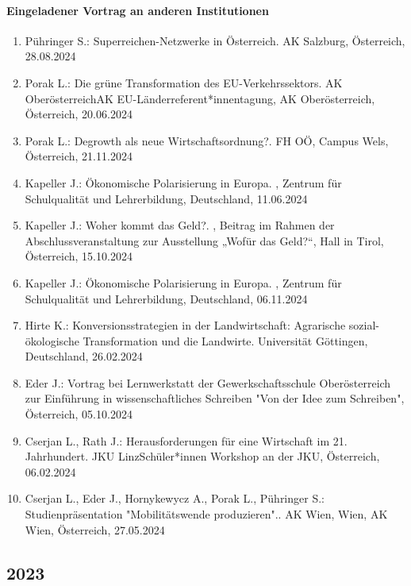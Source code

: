 \paragraph{Eingeladener Vortrag an anderen Institutionen}
\begin{enumerate}
	\item Pühringer S.: Superreichen-Netzwerke in Österreich. AK Salzburg, Österreich, 28.08.2024
	\item Porak L.: Die grüne Transformation des EU-Verkehrssektors. AK OberösterreichAK EU-Länderreferent*innentagung, AK Oberösterreich, Österreich, 20.06.2024
	\item Porak L.: Degrowth als neue Wirtschaftsordnung?. FH OÖ, Campus Wels, Österreich, 21.11.2024
	\item Kapeller J.: Ökonomische Polarisierung in Europa. , Zentrum für Schulqualität und Lehrerbildung, Deutschland, 11.06.2024
	\item Kapeller J.: Woher kommt das Geld?. , Beitrag im Rahmen der Abschlussveranstaltung zur Ausstellung „Wofür das Geld?“, Hall in Tirol, Österreich, 15.10.2024
	\item Kapeller J.: Ökonomische Polarisierung in Europa. , Zentrum für Schulqualität und Lehrerbildung, Deutschland, 06.11.2024
	\item Hirte K.: Konversionsstrategien in der Landwirtschaft: Agrarische sozial-ökologische Transformation und die Landwirte. Universität Göttingen, Deutschland, 26.02.2024
	\item Eder J.: Vortrag bei Lernwerkstatt der Gewerkschaftsschule Oberösterreich zur Einführung in wissenschaftliches Schreiben "Von der Idee zum Schreiben", Österreich, 05.10.2024
	\item Cserjan L., Rath J.: Herausforderungen für eine Wirtschaft im 21. Jahrhundert. JKU LinzSchüler*innen Workshop an der JKU, Österreich, 06.02.2024
	\item Cserjan L., Eder J., Hornykewycz A., Porak L., Pühringer S.: Studienpräsentation "Mobilitätswende produzieren".. AK Wien, Wien, AK Wien, Österreich, 27.05.2024
\end{enumerate}
\subsection*{2023}

